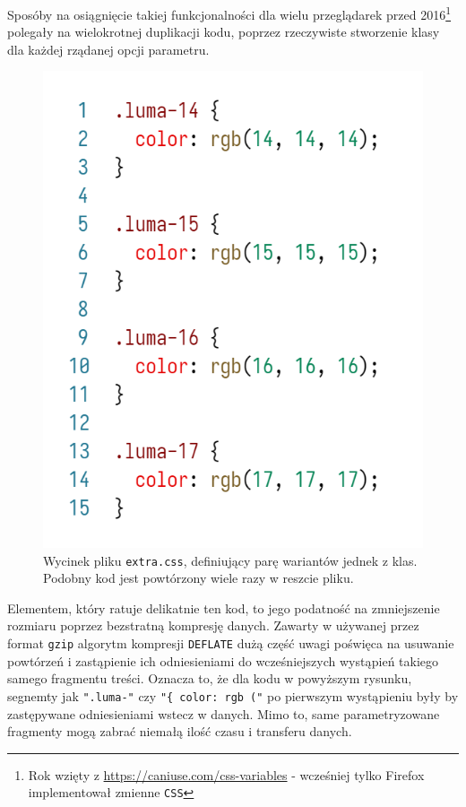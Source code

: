 \documentclass[licencjacka]{pracadypl}
\begin{document}
Sposóby na osiągnięcie takiej funkcjonalności dla wielu przeglądarek przed 2016\footnote{Rok wzięty z \url{https://caniuse.com/css-variables} - wcześniej tylko Firefox implementował zmienne \texttt{CSS}} polegały na wielokrotnej duplikacji kodu, poprzez rzeczywiste stworzenie klasy dla każdej rządanej opcji parametru.

\begin{figure}[H]
  \centering
  \includegraphics[width=\linewidth/\real{2.5}]{images/code-css-luma.png}
  \caption{Wycinek pliku \texttt{extra.css}, definiujący parę wariantów jednek z klas. Podobny kod jest powtórzony wiele razy w reszcie pliku.}
  \label{fig:css-css-luma}
\end{figure}

Elementem, który ratuje delikatnie ten kod, to jego podatność na zmniejszenie rozmiaru poprzez bezstratną kompresję danych. Zawarty w używanej przez format \texttt{gzip} algorytm kompresji \texttt{DEFLATE} dużą część uwagi poświęca na usuwanie powtórzeń i zastąpienie ich odniesieniami do wcześniejszych wystąpień takiego samego fragmentu treści. Oznacza to, że dla kodu w powyższym rysunku, segnemty jak \texttt{".luma-"} czy \texttt{"\{ color: rgb ("} po pierwszym wystąpieniu były by zastępywane odniesieniami wstecz w danych. Mimo to, same parametryzowane fragmenty mogą zabrać niemałą ilość czasu i transferu danych. 
\end{document}
